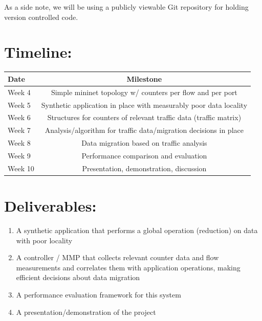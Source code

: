 \documentclass[12pt]{article} \usepackage{graphicx} \usepackage{amsmath}
\begin{document}
As a side note, we will be using a publicly viewable Git repository for holding
version controlled code.

\vspace{10mm}

\section*{Timeline:} \label{timeline} \begin{center} \begin{tabular}{ l || c }
\hline Date & Milestone \\ \hline \hline Week 4  & Simple mininet topology w/
counters per flow and per port \\ \hline Week 5  & Synthetic application in
place with measurably poor data locality \\ \hline Week 6  & Structures for
counters of relevant traffic data (traffic matrix) \\ \hline Week 7  &
Analysis/algorithm for traffic data/migration decisions in place \\ \hline Week
8  & Data migration based on traffic analysis \\ \hline Week 9  & Performance
comparison and evaluation \\ \hline Week 10 & Presentation, demonstration,
discussion \\ \hline \end{tabular} \end{center}


\section*{Deliverables:} \label{deriverables} 
\begin{enumerate} 
  \item A synthetic application that performs a global operation (reduction) on
  data with poor locality 
  \item A controller / MMP that collects relevant counter data and flow
  measurements and correlates them with application operations, making efficient
  decisions about data migration
  \item A performance evaluation framework for this system 
  \item A presentation/demonstration of the project 
\end{enumerate}



% 
\end{document}
